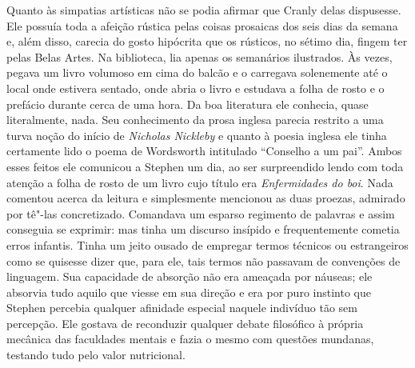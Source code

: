 Quanto às simpatias artísticas não se podia afirmar que Cranly delas
dispusesse.  Ele possuía toda a afeição rústica pelas coisas prosaicas dos seis
dias da semana e, além disso, carecia do gosto hipócrita que os rústicos, no
sétimo dia, fingem ter pelas Belas Artes.  Na biblioteca, lia apenas os
semanários ilustrados.  Às vezes, pegava um livro volumoso em cima do balcão e
o carregava solenemente até o local onde estivera sentado, onde abria o livro e
estudava a folha de rosto e o prefácio durante cerca de uma hora.  Da boa
literatura ele conhecia, quase literalmente, nada.  Seu conhecimento da prosa
inglesa parecia restrito a uma turva noção do início de \textit{Nicholas
Nickleby} e quanto à poesia inglesa ele tinha certamente lido o poema de
Wordsworth intitulado “Conselho a um pai”.  Ambos esses feitos ele comunicou a		
Stephen um dia, ao ser surpreendido lendo com toda atenção a folha de rosto de
um livro cujo título era \textit{Enfermidades do boi}.  Nada comentou acerca da
leitura e simplesmente mencionou as duas proezas, admirado por tê"-las
concretizado.  Comandava um esparso regimento de palavras e assim conseguia se
exprimir: mas tinha um discurso insípido e frequentemente cometia erros
infantis.  \label{tinha"-um} Tinha um jeito ousado de empregar termos técnicos ou estrangeiros
como se quisesse dizer que, para ele, tais termos não passavam de convenções
de linguagem.  Sua capacidade de absorção não era ameaçada por náuseas; ele
absorvia tudo aquilo que viesse em sua direção e era por puro instinto que
Stephen percebia qualquer afinidade especial naquele indivíduo tão sem
percepção.  Ele gostava de reconduzir qualquer debate filosófico à própria
mecânica das faculdades mentais e fazia o mesmo com questões mundanas, testando
tudo pelo valor nutricional.


